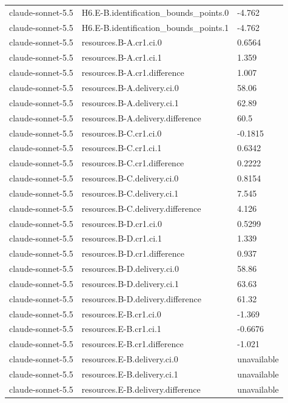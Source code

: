 \begin{tabular}{lll}
claude-sonnet-5.5 & H6.E-B.identification\_bounds\_points.0 & -4.762 \\
claude-sonnet-5.5 & H6.E-B.identification\_bounds\_points.1 & -4.762 \\
claude-sonnet-5.5 & resources.B-A.cr1.ci.0 & 0.6564 \\
claude-sonnet-5.5 & resources.B-A.cr1.ci.1 & 1.359 \\
claude-sonnet-5.5 & resources.B-A.cr1.difference & 1.007 \\
claude-sonnet-5.5 & resources.B-A.delivery.ci.0 & 58.06 \\
claude-sonnet-5.5 & resources.B-A.delivery.ci.1 & 62.89 \\
claude-sonnet-5.5 & resources.B-A.delivery.difference & 60.5 \\
claude-sonnet-5.5 & resources.B-C.cr1.ci.0 & -0.1815 \\
claude-sonnet-5.5 & resources.B-C.cr1.ci.1 & 0.6342 \\
claude-sonnet-5.5 & resources.B-C.cr1.difference & 0.2222 \\
claude-sonnet-5.5 & resources.B-C.delivery.ci.0 & 0.8154 \\
claude-sonnet-5.5 & resources.B-C.delivery.ci.1 & 7.545 \\
claude-sonnet-5.5 & resources.B-C.delivery.difference & 4.126 \\
claude-sonnet-5.5 & resources.B-D.cr1.ci.0 & 0.5299 \\
claude-sonnet-5.5 & resources.B-D.cr1.ci.1 & 1.339 \\
claude-sonnet-5.5 & resources.B-D.cr1.difference & 0.937 \\
claude-sonnet-5.5 & resources.B-D.delivery.ci.0 & 58.86 \\
claude-sonnet-5.5 & resources.B-D.delivery.ci.1 & 63.63 \\
claude-sonnet-5.5 & resources.B-D.delivery.difference & 61.32 \\
claude-sonnet-5.5 & resources.E-B.cr1.ci.0 & -1.369 \\
claude-sonnet-5.5 & resources.E-B.cr1.ci.1 & -0.6676 \\
claude-sonnet-5.5 & resources.E-B.cr1.difference & -1.021 \\
claude-sonnet-5.5 & resources.E-B.delivery.ci.0 & unavailable \\
claude-sonnet-5.5 & resources.E-B.delivery.ci.1 & unavailable \\
claude-sonnet-5.5 & resources.E-B.delivery.difference & unavailable \\

\end{tabular}
